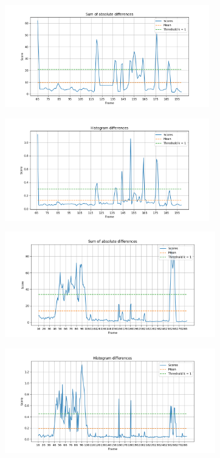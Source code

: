 \documentclass{article}
\begin{document}
\begin{minipage}{0.5\linewidth}
 \label{fig: clip_2_sad2}
\centering
\includegraphics[width=3.5in]{../output/clip_2_score_sad2.png}
\end{minipage}%
\begin{minipage}{0.5\linewidth}
 \label{fig: clip_2_hd}
\centering
\includegraphics[width=3.5in]{../output/clip_2_score_hd.png}
\end{minipage}

\begin{minipage}{0.5\linewidth}
 \label{fig: clip_3_sad2}
\centering
\includegraphics[width=3.6in]{../output/clip_3_score_sad2.png}
\end{minipage}%
\begin{minipage}{0.5\linewidth}
 \label{fig: clip_3_hd}
\centering
\includegraphics[width=3.6in]{../output/clip_3_score_hd.png}
\end{minipage}
\vspace*{10pt}
 
\end{document}

